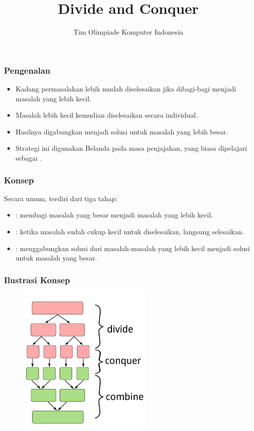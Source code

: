 

\title{Divide and Conquer}
\author{Tim Olimpiade Komputer Indonesia}
\date{}



\begin{frame}
\titlepage
\end{frame}

\begin{frame}
\frametitle{Pengenalan}
\begin{itemize}
  \item Kadang permasalahan lebih mudah diselesaikan jika dibagi-bagi menjadi masalah yang lebih kecil.
  \item Masalah lebih kecil kemudian diselesaikan secara individual.
  \item Hasilnya digabungkan menjadi solusi untuk masalah yang lebih besar.
  \item Strategi ini digunakan Belanda pada masa penjajahan, yang biasa dipelajari sebagai .
\end{itemize}
\end{frame}

\begin{frame}
\frametitle{Konsep}
Secara umum,  terdiri dari tiga tahap:
\begin{itemize}
  \item {}: membagi masalah yang besar menjadi masalah yang lebih kecil.
  \item {}: ketika masalah sudah cukup kecil untuk diselesaikan, langsung selesaikan.
  \item {}: menggabungkan solusi dari masalah-masalah yang lebih kecil menjadi solusi untuk masalah yang besar.
\end{itemize}
\end{frame}

\begin{frame}
\frametitle{Ilustrasi Konsep}
\begin{figure}
  \includegraphics[width=6.5cm]{asset/dnc-concept.pdf}
\end{figure}
\end{frame}

